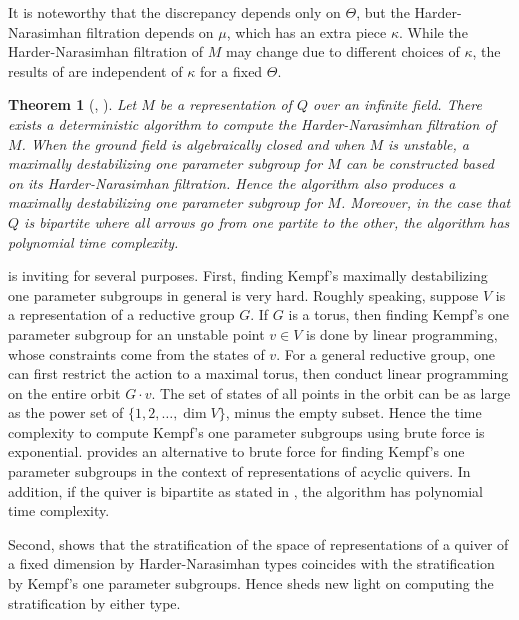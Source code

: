 \documentclass[a4paper]{amsart}
\numberwithin{equation}{section}
\theoremstyle{plain}
\newtheorem{thmx}{Theorem}
\theoremstyle{definition}
\begin{document}
It is noteworthy that the discrepancy depends only on $\Theta$, but the Harder-Narasimhan filtration depends on $\mu$, which has an extra piece $\kappa$. While the Harder-Narasimhan filtration of $M$ may change due to different choices of $\kappa$, the results of  are independent of $\kappa$ for a fixed $\Theta$. 

\begin{thmx}[, ]\label{Effective_alg_intro}
Let $M$ be a representation of $Q$ over an infinite field. There exists a deterministic algorithm to compute the Harder-Narasimhan filtration of $M$. When the ground field is algebraically closed and when $M$ is unstable, a maximally destabilizing one parameter subgroup for $M$ can be constructed based on its Harder-Narasimhan filtration. Hence the algorithm also produces a maximally destabilizing one parameter subgroup for $M$. Moreover, in the case that $Q$ is bipartite where all arrows go from one partite to the other, the algorithm has polynomial time complexity.
\end{thmx}

 is inviting for several purposes. First, finding Kempf's maximally destabilizing one parameter subgroups in general is very hard. Roughly speaking, suppose $V$ is a representation of a reductive group $G$. If $G$ is a torus, then finding Kempf's one parameter subgroup for an unstable point $v\in V$ is done by linear programming, whose constraints come from the states of $v$. For a general reductive group, one can first restrict the action to a maximal torus, then conduct linear programming on the entire orbit $G\cdot v$. The set of states of all points in the orbit can be as large as the power set of $\{1,2,\ldots,\dim V\}$, minus the empty subset. Hence the time complexity to compute Kempf's one parameter subgroups using brute force is exponential.  provides an alternative to brute force for finding Kempf's one parameter subgroups in the context of representations of acyclic quivers. In addition, if the quiver is bipartite as stated in , the algorithm has polynomial time complexity. 

Second, \cite{MR3261979} shows that the stratification of the space of representations of a quiver of a fixed dimension by Harder-Narasimhan types coincides with the stratification by Kempf's one parameter subgroups. Hence   sheds new light on computing the stratification by either type. 
\end{document}
